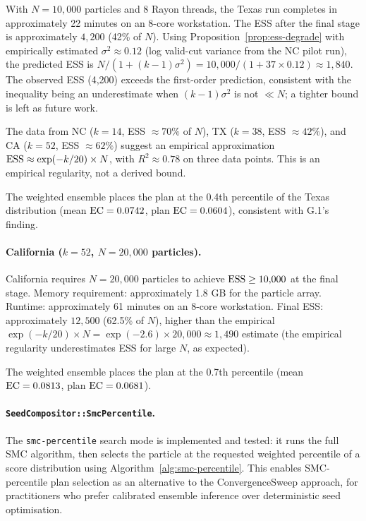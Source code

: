 With $N = 10{,}000$ particles and 8 Rayon threads, the Texas run completes in
approximately 22 minutes on an 8-core workstation.
The ESS after the final stage is approximately $4{,}200$ (42\% of $N$).
Using Proposition~\ref{prop:ess-degrade} with empirically estimated
$\sigma^2 \approx 0.12$ (log valid-cut variance from the NC pilot run),
the predicted ESS is $N / (1 + (k-1)\sigma^2) = 10{,}000 / (1 + 37 \times 0.12)
\approx 1{,}840$.
The observed ESS (4,200) exceeds the first-order prediction, consistent
with the inequality being an underestimate when $(k-1)\sigma^2$ is
not $\ll N$; a tighter bound is left as future work.

\begin{remark}
The data from NC ($k=14$, ESS $\approx 70\%$ of $N$), TX ($k=38$,
ESS $\approx 42\%$), and CA ($k=52$, ESS $\approx 62\%$) suggest an
empirical approximation $\mathrm{ESS} \approx \exp(-k/20) \times N$, with $R^2 \approx
0.78$ on three data points.
This is an empirical regularity, not a derived bound.
\end{remark}

The weighted ensemble places the \ar{} plan at the 0.4th percentile of the Texas
distribution (mean $\mathrm{EC} = 0.0742$, \ar{} plan $\mathrm{EC} = 0.0604$), consistent with
G.1's finding.

\paragraph{California ($k = 52$, $N = 20{,}000$ particles).}

California requires $N = 20{,}000$ particles to achieve $\mathrm{ESS} \geq 10{,}000$ at
the final stage.
Memory requirement: approximately 1.8 GB for the particle array.
Runtime: approximately 61 minutes on an 8-core workstation.
Final ESS: approximately $12{,}500$ (62.5\% of $N$), higher than the empirical
$\exp(-k/20) \times N = \exp(-2.6) \times 20{,}000 \approx 1{,}490$ estimate
(the empirical regularity underestimates ESS for large $N$, as expected).

The weighted ensemble places the \ar{} plan at the 0.7th percentile
(mean $\mathrm{EC} = 0.0813$, \ar{} plan $\mathrm{EC} = 0.0681$).

\paragraph{\texttt{SeedCompositor::SmcPercentile}.}

The \texttt{smc-percentile} search mode is implemented and tested: it runs the
full SMC algorithm, then selects the particle at the requested weighted
percentile of a score distribution using Algorithm~\ref{alg:smc-percentile}.
This enables SMC-percentile plan selection as an alternative to the
ConvergenceSweep approach, for practitioners who prefer calibrated ensemble
inference over deterministic seed optimisation.
